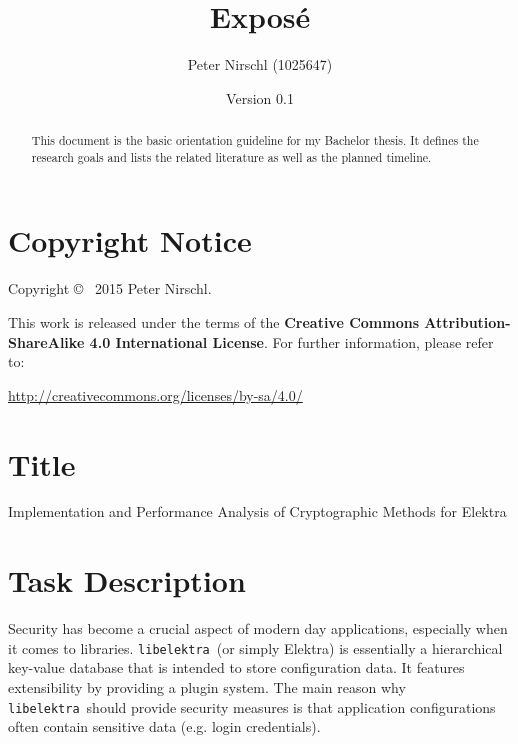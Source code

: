 \documentclass[a4paper,12pt]{article}
\title{Exposé}
\author{Peter Nirschl (1025647)}
\date{Version 0.1}
\newcommand{\libelektra}{\texttt{libelektra}~}
\begin{document}
\maketitle
\begin{abstract}
This document is the basic orientation guideline for my Bachelor thesis.
It defines the research goals and lists the related literature as well as the planned timeline.
\end{abstract}

\vfill

\section*{Copyright Notice}

Copyright \copyright~ 2015 Peter Nirschl.

This work is released under the terms of the \textbf{Creative Commons Attribution-ShareAlike 4.0 International License}.
For further information, please refer to:

\url{http://creativecommons.org/licenses/by-sa/4.0/}

\newpage

\section{Title}

Implementation and Performance Analysis of Cryptographic Methods for Elektra


\section{Task Description}

Security has become a crucial aspect of modern day applications, especially when it comes to libraries.
\libelektra (or simply Elektra) is essentially a hierarchical key-value database that is intended to store configuration data. It features extensibility by providing a plugin system. The main reason why \libelektra should provide security measures is that application configurations often contain sensitive data (e.g. login credentials).
\end{document}
